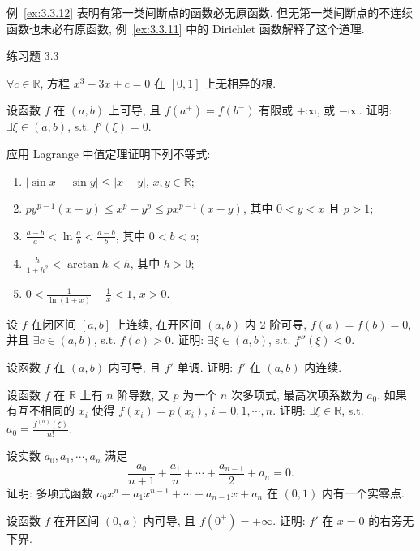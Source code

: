 \begin{remark}\label{rem:3.3.3}
例~\ref{ex:3.3.12} 表明有第一类间断点的函数必无原函数. 但无第一类间断点的不连续函数也未必有原函数, 例~\ref{ex:3.3.11} 中的 Dirichlet 函数解释了这个道理.
\end{remark}

\begin{exblock}{练习题 3.3}
  \item $\forall c\in\mathbb{R}$, 方程 $x^{3}-3x+c=0$ 在 $[0,1]$ 上无相异的根.

  \item 设函数 $f$ 在 $(a,b)$ 上可导, 且 $f(a^+)=f(b^-)$ 有限或 $+\infty$, 或 $-\infty$. 证明: $\exists\xi\in(a,b)$, s.t. $f'(\xi)=0$.

  \item 应用 Lagrange 中值定理证明下列不等式:
  \begin{enumerate}[label=(\arabic*)]
    \item $|\sin x-\sin y|\leqslant|x-y|$, $x,y\in\mathbb{R}$;
    \item $py^{p-1}(x-y)\leqslant x^{p}-y^{p}\leqslant px^{p-1}(x-y)$, 其中 $0<y<x$ 且 $p>1$;
    \item $\frac{a-b}{a}<\ln\frac{a}{b}<\frac{a-b}{b}$, 其中 $0<b<a$;
    \item $\frac{h}{1+h^{2}}<\arctan h<h$, 其中 $h>0$;
    \item $0<\frac{1}{\ln(1+x)}-\frac{1}{x}<1$, $x>0$.
  \end{enumerate}

  \item 设 $f$ 在闭区间 $[a,b]$ 上连续, 在开区间 $(a,b)$ 内 2 阶可导, $f(a)=f(b)=0$, 并且 $\exists c\in(a,b)$, s.t. $f(c)>0$. 证明: $\exists\xi\in(a,b)$, s.t. $f''(\xi)<0$.

  \item 设函数 $f$ 在 $(a,b)$ 内可导, 且 $f'$ 单调. 证明: $f'$ 在 $(a,b)$ 内连续.

  \item 设函数 $f$ 在 $\mathbb{R}$ 上有 $n$ 阶导数, 又 $p$ 为一个 $n$ 次多项式, 最高次项系数为 $a_0$. 如果有互不相同的 $x_i$ 使得 $f(x_i)=p(x_i)$, $i=0,1,\cdots,n$. 证明: $\exists\xi\in\mathbb{R}$, s.t. $a_0=\frac{f^{(n)}(\xi)}{n!}$.

  \item 设实数 $a_0,a_1,\cdots,a_n$ 满足
  \[
  \frac{a_0}{n+1}+\frac{a_1}{n}+\cdots+\frac{a_{n-1}}{2}+a_n=0.
\]
  证明: 多项式函数 $a_0x^{n}+a_1x^{n-1}+\cdots+a_{n-1}x+a_n$ 在 $(0,1)$ 内有一个实零点.

  \item 设函数 $f$ 在开区间 $(0,a)$ 内可导, 且 $f(0^+)=+\infty$. 证明: $f'$ 在 $x=0$ 的右旁无下界.


\end{exblock}
